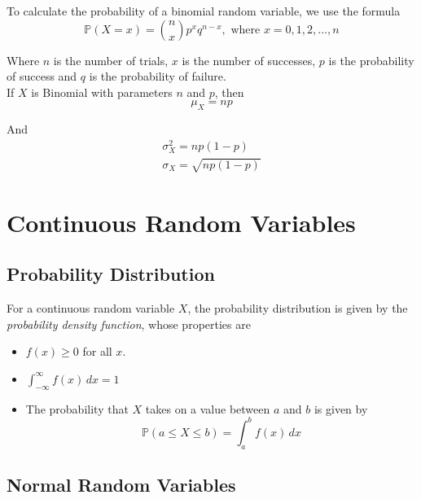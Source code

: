 \documentclass[12pt letter]{report}
\begin{document}
To calculate the probability of a binomial random variable, we use the formula
\[
  \mathbb{P} \left( X = x \right) = \binom{n}{x} p^x q^{n-x}, \text{ where } x = 0, 1, 2, \ldots, n
\]

Where $n$ is the number of trials, $x$ is the number of successes, $p$ is the probability of success and $q$ is the
probability of failure. \\

If $X$ is Binomial with parameters $n$ and $p$, then
\[
  \mu_{X} = np
\]

And
\begin{align*}
  \sigma^2_{X} = np \left( 1 - p \right) \\
  \sigma_{X} = \sqrt{np \left( 1 - p \right) }
\end{align*}

\section{Continuous Random Variables}

\subsection{Probability Distribution}

For a continuous random variable $X$, the probability distribution is given by the \textit{probability density
  function}, whose properties are

\begin{itemize}
  \item $f \left( x \right) \geq 0$ for all $x$.
  \item $\int_{-\infty}^{\infty} f \left( x \right) \, dx = 1$
  \item The probability that $X$ takes on a value between $a$ and $b$ is given by
        \[
          \mathbb{P} \left( a \leq X \leq b \right) = \int_{a}^{b} f \left( x \right) \, dx
        \]
\end{itemize}


\subsection{Normal Random Variables}
\end{document}
